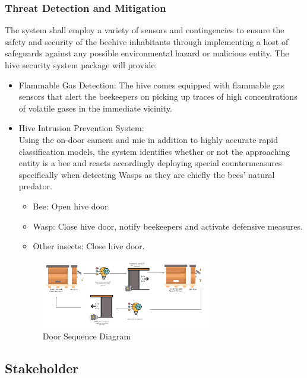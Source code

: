 \documentclass[12pt]{article}
\begin{document}
	\subsubsection{Threat Detection and Mitigation}
	The system shall employ a variety of sensors and contingencies to ensure the safety and security of the beehive inhabitants through implementing a host of safeguards against any possible environmental hazard or malicious entity. The hive security system package will provide: \\
	\begin{itemize}
		\item Flammable Gas Detection:
		The hive comes equipped with flammable gas sensors that alert the beekeepers on picking up traces of high concentrations of volatile gases in the immediate vicinity. \\
		\item Hive Intrusion Prevention System:\\
		Using the on-door camera and mic in addition to highly accurate rapid classification models, the system identifies whether or not the approaching entity is a bee and reacts accordingly deploying special countermeasures specifically when detecting Wasps as they are chiefly the bees' natural predator.
		
		\begin{itemize}
			\item Bee: Open hive door.
			\item Wasp: Close hive door, notify beekeepers and activate defensive measures.
			\item Other insects: Close hive door.
		\end{itemize}
		\begin{figure}[H]
			\centering
			\includegraphics[width=0.7\textwidth]{Images/Diagrams/Motorized Door.png}
			\caption{Door Sequence Diagram}
			\label{fig:DOOR}
		\end{figure}
	\end{itemize}
	
	\subsection{Stakeholder}
\end{document}
